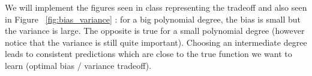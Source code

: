 \documentclass{../tex_import/ETHuebung_english}
\begin{document}
We will implement the figures seen in class representing the tradeoff and also seen in Figure ~\ref{fig:bias_variance} : for a big polynomial degree, the bias is small but the variance is large. The opposite is true for a small polynomial degree (however notice that the variance is still quite important). Choosing an intermediate degree leads to consistent predictions which are close to the true function we want to learn (optimal bias / variance tradeoff).





\bigskip
\end{document}
